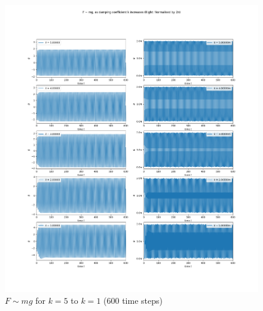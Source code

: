 \documentclass[10pt, twocolumn]{article}
\begin{document}
\begin{figure}
    \centering
    \includegraphics[width = \columnwidth]{Projects/ForcedSimplePendulum/Plots/F~mg as damping coefficient k increases from 5 to 1 (long).png}
    \caption{$F \sim{mg}$ for $k = 5$ to $k = 1$ (600 time steps)}
    \label{k 5 to 1 long}
\end{figure}
\end{document}
